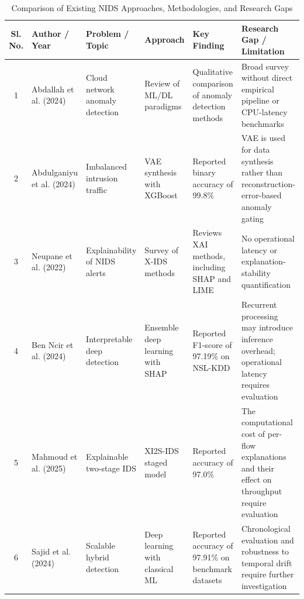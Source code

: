 \documentclass[12pt,a4paper]{report}
\begin{document}
\begin{table}[H]
\centering
\caption{Comparison of Existing NIDS Approaches, Methodologies, and Research Gaps}
\label{tab:literature_review}
\scriptsize
\setlength{\tabcolsep}{3pt}
\renewcommand{\arraystretch}{1.25}

\begin{tabularx}{\textwidth}{
|c|
>{\raggedright\arraybackslash}p{}|
>{\raggedright\arraybackslash}p{}|
>{\raggedright\arraybackslash}p{}|
>{\raggedright\arraybackslash}p{}|
Y|}
\hline
\textbf{Sl. No.} &
\textbf{Author / Year} &
\textbf{Problem / Topic} &
\textbf{Approach} &
\textbf{Key Finding} &
\textbf{Research Gap / Limitation} \\
\hline

1 & Abdallah et al. (2024)
& Cloud network anomaly detection
& Review of ML/DL paradigms
& Qualitative comparison of anomaly detection methods
& Broad survey without direct empirical pipeline or CPU-latency benchmarks \\
\hline

2 & Abdulganiyu et al. (2024)
& Imbalanced intrusion traffic
& VAE synthesis with XGBoost
& Reported binary accuracy of 99.8\%
& VAE is used for data synthesis rather than reconstruction-error-based anomaly gating \\
\hline

3 & Neupane et al. (2022)
& Explainability of NIDS alerts
& Survey of X-IDS methods
& Reviews XAI methods, including SHAP and LIME
& No operational latency or explanation-stability quantification \\
\hline

4 & Ben Ncir et al. (2024)
& Interpretable deep detection
& Ensemble deep learning with SHAP
& Reported F1-score of 97.19\% on NSL-KDD
& Recurrent processing may introduce inference overhead; operational latency requires evaluation \\
\hline

5 & Mahmoud et al. (2025)
& Explainable two-stage IDS
& XI2S-IDS staged model
& Reported accuracy of 97.0\%
& The computational cost of per-flow explanations and their effect on throughput require evaluation \\
\hline

6 & Sajid et al. (2024)
& Scalable hybrid detection
& Deep learning with classical ML
& Reported accuracy of 97.91\% on benchmark datasets
& Chronological evaluation and robustness to temporal drift require further investigation \\
\hline


\end{tabularx}
\end{table}
\end{document}
